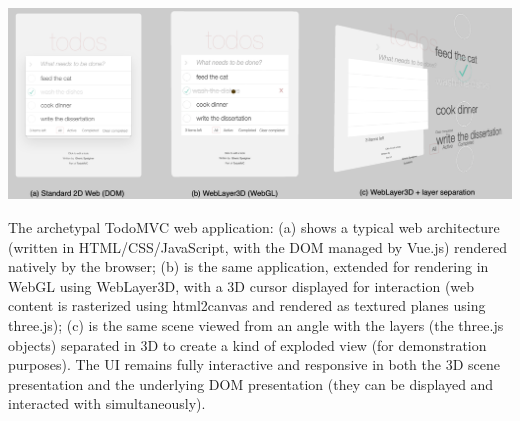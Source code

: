 \documentclass[sigconf]{acmart}
\begin{document}
%
\begin{teaserfigure}
  \begin{center}
  \includegraphics[width=\textwidth]{TodoMVC-Banner2.png}
  \end{center}
  \caption{The archetypal TodoMVC web application: (a) shows a typical web architecture (written in HTML/CSS/JavaScript, with the DOM managed by Vue.js) rendered natively by the browser; (b) is the same application, extended for rendering in WebGL using WebLayer3D, with a 3D cursor displayed for interaction (web content is rasterized using html2canvas and rendered as textured planes using three.js); (c) is the same scene viewed from an angle with the layers (the three.js objects) separated in 3D to create a kind of exploded view (for demonstration purposes). The UI remains fully interactive and responsive in both the 3D scene presentation and the underlying DOM presentation (they can be displayed and interacted with simultaneously).}
  \Description{}
  \label{fig:teaser}
\end{teaserfigure}

%
\maketitle
\end{document}
